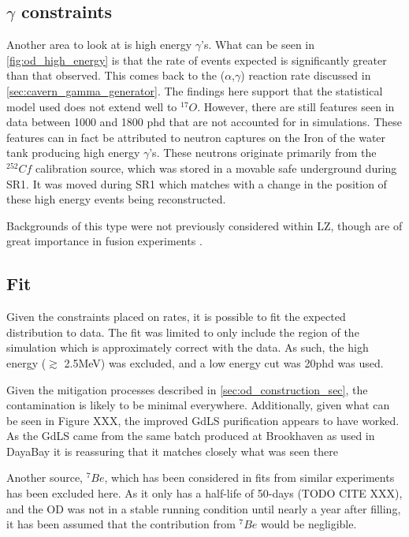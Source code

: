 \subsection{$\gamma$ constraints}
\par
Another area to look at is high energy $\gamma$'s.
What can be seen in \autoref{fig:od_high_energy} is that the rate of events expected is significantly greater than that observed.
This comes back to the ($\alpha$,$\gamma$) reaction rate discussed in \autoref{sec:cavern_gamma_generator}.
The findings here support that the statistical model used does not extend well to ${}^{17}O$.
However, there are still features seen in data between 1000 and 1800 phd that are not accounted for in simulations.
These features can in fact be attributed to neutron captures on the Iron of the water tank producing high energy $\gamma$'s.
These neutrons originate primarily from the ${}^{252}Cf$ calibration source, which was stored in a movable safe underground during SR1.
It was moved during SR1 which matches with a change in the position of these high energy events being reconstructed.
\par
Backgrounds of this type were not previously considered within LZ, though are of great importance in fusion experiments \cite{iter_neutrons_ref}.




\subsection{Fit}
\par
Given the constraints placed on rates, it is possible to fit the expected distribution to data. 
The fit was limited to only include the region of the simulation which is approximately correct with the data. 
As such, the high energy ($\gtrsim$ 2.5MeV) was excluded, and a low energy cut was 20phd was used.


Given the mitigation processes described in \autoref{sec:od_construction_sec}, the contamination is likely to be minimal everywhere. 
Additionally, given what can be seen in Figure XXX, the improved GdLS purification appears to have worked.
As the GdLS came from the same batch produced at Brookhaven as used in DayaBay it is reassuring that it matches closely what was seen there

\par

\par
Another source, ${}^{7}Be$, which has been considered in fits from similar experiments has been excluded here.
As it only has a half-life of 50-days (TODO CITE XXX), and the OD was not in a stable running condition until nearly a year after filling, it has been assumed that the contribution from ${}^{7}Be$ would be negligible.


